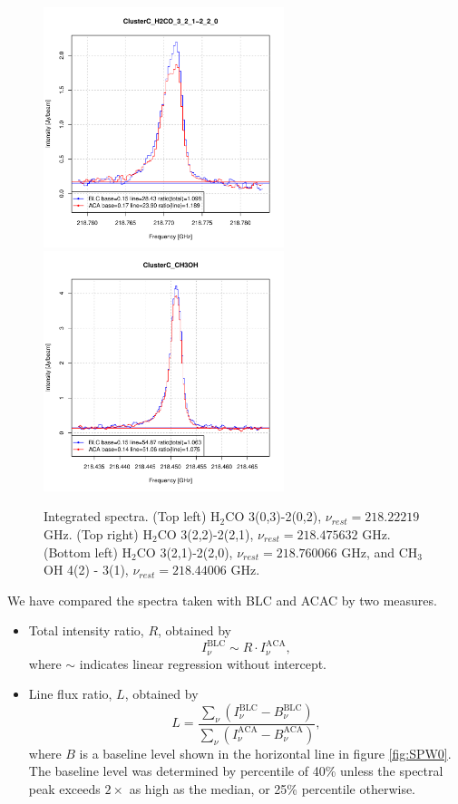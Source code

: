 \documentclass[a4paper, 10pt]{scrartcl}
\begin{document}
\begin{figure}[h]
	\includegraphics[width=7cm]{ClusterC_H2CO_3_2_1-2_2_0.pdf}\includegraphics[width=7cm]{ClusterC_CH3OH.pdf}
	\caption{Integrated spectra. (Top left) H$_2$CO 3(0,3)-2(0,2), $\nu_{rest} = 218.22219$ GHz. (Top right) H$_2$CO 3(2,2)-2(2,1), $\nu_{rest} = 218.475632$ GHz. (Bottom left) H$_2$CO 3(2,1)-2(2,0), $\nu_{rest} = 218.760066$ GHz, and CH$_3$OH 4(2) - 3(1), $\nu_{rest} = 218.44006$ GHz.}\label{fig:H2CO}
\end{figure}


We have compared the spectra taken with BLC and ACAC by two measures.

\begin{itemize}
\item Total intensity ratio, $R$, obtained by \[ I^\mathrm{BLC}_{\nu} \sim R \cdot I^\mathrm{ACA}_{\nu}, \] where $\sim$ indicates linear regression without intercept.

\item Line flux ratio, $L$, obtained by \[ L = \frac{\sum_{\nu} (I^\mathrm{BLC}_{\nu} - B^\mathrm{BLC}_{\nu})}{\sum_{\nu} (I^\mathrm{ACA}_{\nu} - B^\mathrm{ACA}_{\nu}) }, \] where $B$ is a baseline level shown in the horizontal line in figure \ref{fig:SPW0}. The baseline level was determined by percentile of 40\% unless the spectral peak exceeds $2\times$ as high as the median, or 25\% percentile otherwise.
\end{itemize}
\end{document}

